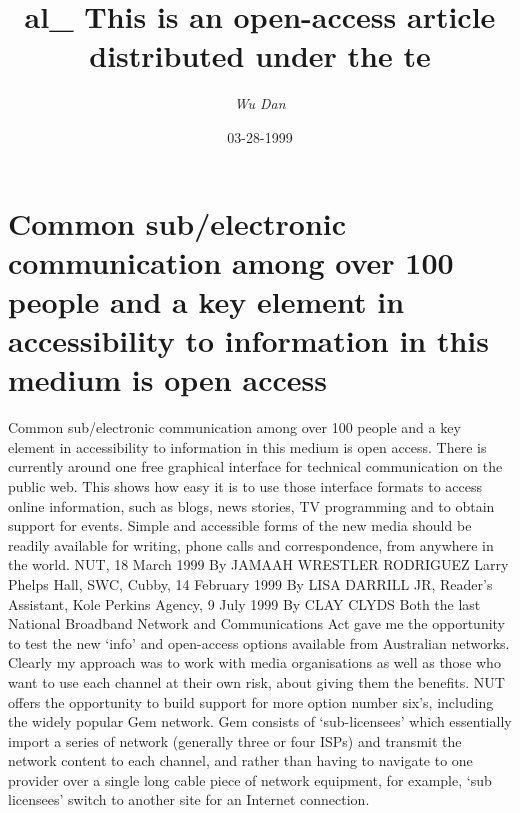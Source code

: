 \documentclass{article}%
\title{al\_ This is an open{-}access article distributed under the te}%
\author{\textit{Wu Dan}}%
\date{03-28-1999}%
\begin{document}
%
\normalsize%
\maketitle%
\section{Common sub/electronic communication among over 100 people and a key element in accessibility to information in this medium is open access}%
\label{sec:Commonsub/electroniccommunicationamongover100peopleandakeyelementinaccessibilitytoinformationinthismediumisopenaccess}%
Common sub/electronic communication among over 100 people and a key element in accessibility to information in this medium is open access. There is currently around one free graphical interface for technical communication on the public web. This shows how easy it is to use those interface formats to access online information, such as blogs, news stories, TV programming and to obtain support for events. Simple and accessible forms of the new media should be readily available for writing, phone calls and correspondence, from anywhere in the world.\newline%
NUT, 18 March 1999\newline%
By JAMAAH WRESTLER RODRIGUEZ\newline%
Larry Phelps Hall, SWC, Cubby, 14 February 1999\newline%
By LISA DARRILL JR, Reader’s Assistant, Kole Perkins Agency, 9 July 1999\newline%
By CLAY CLYDS\newline%
Both the last National Broadband Network and Communications Act gave me the opportunity to test the new ‘info’ and open{-}access options available from Australian networks. Clearly my approach was to work with media organisations as well as those who want to use each channel at their own risk, about giving them the benefits.\newline%
NUT offers the opportunity to build support for more option number six’s, including the widely popular Gem network. Gem consists of ‘sub{-}licensees’ which essentially import a series of network (generally three or four ISPs) and transmit the network content to each channel, and rather than having to navigate to one provider over a single long cable piece of network equipment, for example, ‘sub licensees’ switch to another site for an Internet connection.\newline%
\end{document}
